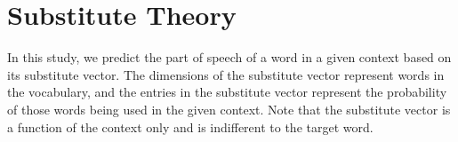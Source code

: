 \section{Substitute Theory}
\label{sec:subthr}

In this study, we predict the part of speech of a word in a given
context based on its substitute vector.  The dimensions of the
substitute vector represent words in the vocabulary, and the entries
in the substitute vector represent the probability of those words
being used in the given context.  Note that the substitute vector is a
function of the context only and is indifferent to the target word.



